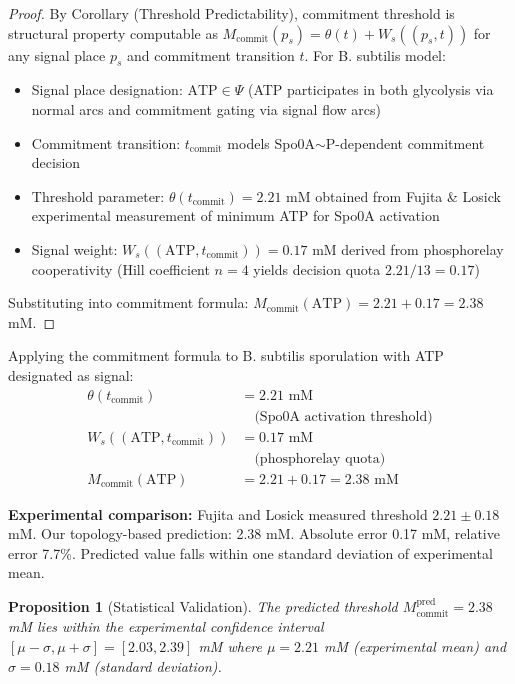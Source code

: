 \documentclass[10pt,letterpaper]{article}
\newtheorem{proposition}{Proposition}
\begin{document}
\begin{proof}
By Corollary (Threshold Predictability), commitment threshold is structural property computable as
$M_{\text{commit}}(p_s) = \theta(t) + W_s((p_s,t))$
for any signal place $p_s$ and commitment transition $t$. For B. subtilis model:
\begin{itemize}
\item Signal place designation: $\text{ATP} \in \Psi$ (ATP participates in both glycolysis via normal arcs and commitment gating via signal flow arcs)
\item Commitment transition: $t_{\text{commit}}$ models Spo0A$\sim$P-dependent commitment decision
\item Threshold parameter: $\theta(t_{\text{commit}}) = 2.21$ mM obtained from Fujita \& Losick experimental measurement of minimum ATP for Spo0A activation
\item Signal weight: $W_s((\text{ATP}, t_{\text{commit}})) = 0.17$ mM derived from phosphorelay cooperativity (Hill coefficient $n=4$ yields decision quota $2.21/13 = 0.17$)
\end{itemize}
Substituting into commitment formula:
$M_{\text{commit}}(\text{ATP}) = 2.21 + 0.17 = 2.38$ mM.
\end{proof}

Applying the commitment formula to B. subtilis sporulation with ATP designated as signal:
\begin{align}
\theta(t_{\text{commit}}) &= 2.21 \text{ mM} \nonumber \\
&\quad \text{(Spo0A activation threshold)} \\
W_s((\text{ATP}, t_{\text{commit}})) &= 0.17 \text{ mM} \nonumber \\
&\quad \text{(phosphorelay quota)} \\
M_{\text{commit}}(\text{ATP}) &= 2.21 + 0.17 = 2.38 \text{ mM}
\end{align}

\textbf{Experimental comparison:} Fujita and Losick measured threshold $2.21 \pm 0.18$ mM. Our topology-based prediction: 2.38 mM. Absolute error 0.17 mM, relative error 7.7\%. Predicted value falls within one standard deviation of experimental mean.

\begin{proposition}[Statistical Validation]
The predicted threshold $M_{\text{commit}}^{\text{pred}} = 2.38$ mM lies within the experimental confidence interval
$[\mu - \sigma, \mu + \sigma] = [2.03, 2.39]$ mM
where $\mu = 2.21$ mM (experimental mean) and $\sigma = 0.18$ mM (standard deviation).
\end{proposition}
\end{document}
